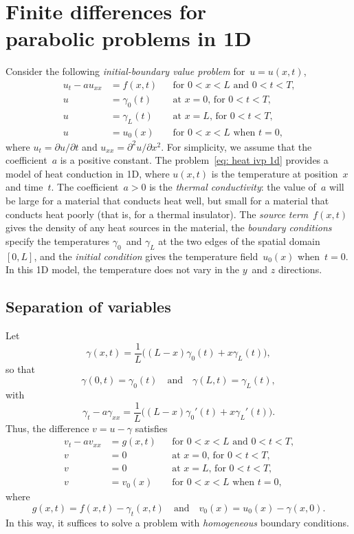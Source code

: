 \chapter[Finite differences for parabolic problems]{Finite differences for \\
parabolic problems in 1D}
Consider the following \emph{initial-boundary value problem} for~$u=u(x,t)$,
\begin{equation}\label{eq: heat ivp 1d}
\begin{aligned}
u_t-au_{xx}&=f(x,t)&&\text{for $0<x<L$ and $0<t<T$,}\\
u&=\gamma_0(t)&&\text{at $x=0$, for $0<t<T$,}\\
u&=\gamma_L(t)&&\text{at $x=L$, for $0<t<T$,}\\
u&=u_0(x)&&\text{for $0<x<L$ when $t=0$,}
\end{aligned}
\end{equation}
where $u_t=\partial u/\partial t$ and $u_{xx}=\partial^2u/\partial x^2$.  For 
simplicity, we assume that the coefficient~$a$ is a positive constant.  The 
problem~\eqref{eq: heat ivp 1d} provides a model of heat conduction in 1D, 
where $u(x,t)$ is the temperature at position~$x$ and time~$t$.  The 
coefficient~$a>0$ is the \emph{thermal conductivity}: the value of~$a$ will be 
large for a material that conducts heat well, but small for a 
material that conducts heat poorly (that is, for a thermal insulator).  The 
\emph{source term}~$f(x,t)$ gives the density of any heat sources in the 
material, the \emph{boundary conditions} specify the temperatures $\gamma_0$~and 
$\gamma_L$ at the two edges of the spatial domain~$[0,L]$, and the 
\emph{initial condition} gives the temperature field~$u_0(x)$ when~$t=0$.  In 
this 1D model, the temperature does not vary in the $y$~and $z$ directions.

\section{Separation of variables}\label{sec: separation}

Let
\[
\gamma(x,t)=\frac{1}{L}\bigl((L-x)\gamma_0(t)+x\gamma_L(t)\bigr),
\]
so that
\[
\gamma(0,t)=\gamma_0(t)\quad\text{and}\quad\gamma(L,t)=\gamma_L(t),
\]
with
\[
\gamma_t-a\gamma_{xx}=\frac{1}{L}\bigl((L-x)\gamma_0'(t)+x\gamma_L'(t)\bigr).
\]
Thus, the difference $v=u-\gamma$ satisfies 
\begin{equation}\label{eq: heat ivp homog 1d}
\begin{aligned}
v_t-av_{xx}&=g(x,t)&&\text{for $0<x<L$ and $0<t<T$,}\\
v&=0&&\text{at $x=0$, for $0<t<T$,}\\
v&=0&&\text{at $x=L$, for $0<t<T$,}\\
v&=v_0(x)&&\text{for $0<x<L$ when $t=0$,}
\end{aligned}
\end{equation}
where 
\[
g(x,t)=f(x,t)-\gamma_t(x,t)
\quad\text{and}\quad
v_0(x)=u_0(x)-\gamma(x,0).
\]
In this way, it suffices to solve a problem with \emph{homogeneous} boundary 
conditions.


